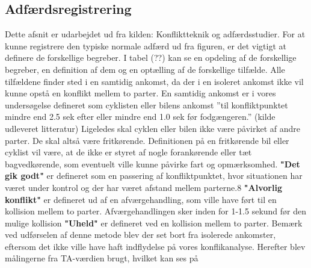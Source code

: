 \subsection{Adfærdsregistrering}
\label{adfreg}
Dette afsnit er udarbejdet ud fra kilden: Konfliktteknik og adfærdsstudier.
For	at kunne registrere den typiske normale adfærd ud	 fra figuren, er det vigtigt at definere	de	forskellige	begreber. I tabel (??) kan se en	opdeling af de forskellige begreber, en definition af dem og en optælling af de forskellige tilfælde. Alle	tilfældene finder sted i	en samtidig ankomst, da der i en isoleret ankomst	 ikke vil kunne	opstå en konflikt mellem to parter. En samtidig ankomst er i vores undersøgelse defineret som cyklisten eller bilens ankomst ”til konfliktpunktet mindre end 2.5 sek efter eller mindre end 1.0 sek før fodgængeren.” (kilde udleveret	litteratur)	Ligeledes skal cyklen	eller bilen ikke være påvirket af andre parter. De skal altså være fritkørende. Definitionen på en fritkørende bil eller cyklist	vil	være, at de ikke er styret af nogle	forankørende eller tæt bagvedkørende, som eventuelt ville kunne påvirke fart og opmærksomhed.
\textbf{"Det	gik	godt"} er defineret som en passering af konfliktpunktet, hvor situationen
har	været under kontrol og der har været afstand mellem parterne.8
\textbf{"Alvorlig konflikt"}	er defineret ud af en afværgehandling, som ville have ført til en kollision mellem to parter. Afværgehandlingen sker inden for 1-1.5 sekund før den mulige	kollision%
\textbf{"Uheld"} er defineret ved en kollision mellem to parter.
Bemærk ved udførselen af denne metode blev der set bort fra isolerede ankomster, eftersom det ikke ville have haft indflydelse på vores konflikanalyse. Herefter blev målingerne fra TA-værdien brugt, hvilket kan ses på %
